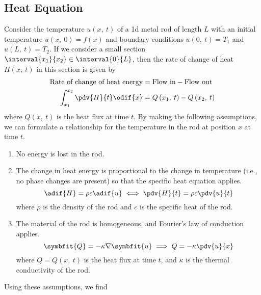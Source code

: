 \documentclass{article}
\begin{document}
\subsection{Heat Equation}
Consider the temperature \(u\left( x,\: t \right)\) of a 1d metal rod
of length \(L\) with an initial temperature \(u\left( x,\: 0 \right) =
f\left( x \right)\) and boundary conditions \(u\left( 0,\: t \right) =
T_1\) and \(u\left( L,\: t \right) = T_2\). If we consider a small
section \(\interval{x_1}{x_2} \in \interval{0}{L}\), then the rate of
change of heat \(H\left( x,\: t \right)\) in this section is given by
\begin{align*}
    \text{Rate of change of heat energy} & = \text{Flow in} - \text{Flow out}                    \\
    \int_{x_1}^{x_2} \pdv{H}{t} \odif{x} & = Q\left( x_1,\: t \right) - Q\left( x_2,\: t \right)
\end{align*}
where \(Q\left( x,\: t \right)\) is the heat flux at time \(t\).
By making the following assumptions, we can formulate a relationship for the temperature in the rod at position \(x\) at time \(t\).
\begin{enumerate}
    \item No energy is lost in the rod.
    \item The change in heat energy is proportional to the change in
          temperature (i.e., no phase changes are present) so that the
          specific heat equation applies.
          \begin{equation*}
              \adif{H} = \rho c \adif{u} \iff \pdv{H}{t} = \rho c \pdv{u}{t}
          \end{equation*}
          where \(\rho\) is the density of the rod and \(c\) is the specific heat of the rod.
    \item The material of the rod is homogeneous, and Fourier's law of
          conduction applies.
          \begin{equation*}
              \symbfit{Q} = -\kappa \nabla \symbfit{u} \implies Q = -\kappa \pdv{u}{x}
          \end{equation*}
          where \(Q = Q\left( x,\: t \right)\) is the heat flux at time \(t\), and \(\kappa\) is the thermal conductivity of the rod.
\end{enumerate}
Using these assumptions, we find
\end{document}
